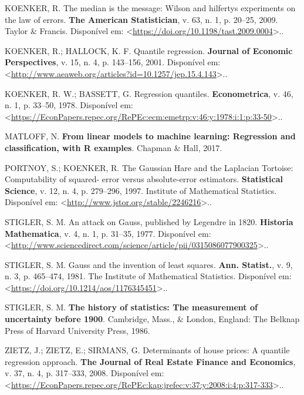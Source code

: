 \documentclass[a4paper, 12pt]{article}
\begin{document}
\leavevmode\hypertarget{ref-mim}{}%
KOENKER, R. The median is the message: Wilson and hilfertys experiments
on the law of errors. \textbf{The American Statistician}, v. 63, n. 1,
p. 20--25, 2009. Taylor \& Francis. Disponível em:
\textless{}\url{https://doi.org/10.1198/tast.2009.0004}\textgreater{}..

\leavevmode\hypertarget{ref-qr}{}%
KOENKER, R.; HALLOCK, K. F. Quantile regression. \textbf{Journal of
Economic Perspectives}, v. 15, n. 4, p. 143--156, 2001. Disponível em:
\textless{}\url{http://www.aeaweb.org/articles?id=10.1257/jep.15.4.143}\textgreater{}..

\leavevmode\hypertarget{ref-koenker1978}{}%
KOENKER, R. W.; BASSETT, G. Regression quantiles. \textbf{Econometrica},
v. 46, n. 1, p. 33--50, 1978. Disponível em:
\textless{}\url{https://EconPapers.repec.org/RePEc:ecm:emetrp:v:46:y:1978:i:1:p:33-50}\textgreater{}..

\leavevmode\hypertarget{ref-matloff2017}{}%
MATLOFF, N. \textbf{From linear models to machine learning: Regression
and classification, with R examples}. Chapman \& Hall, 2017.

\leavevmode\hypertarget{ref-tortoise}{}%
PORTNOY, S.; KOENKER, R. The Gaussian Hare and the Laplacian Tortoise:
Computability of squared- error versus absolute-error estimators.
\textbf{Statistical Science}, v. 12, n. 4, p. 279--296, 1997. Institute
of Mathematical Statistics. Disponível em:
\textless{}\url{http://www.jstor.org/stable/2246216}\textgreater{}..

\leavevmode\hypertarget{ref-STIGLER197731}{}%
STIGLER, S. M. An attack on Gauss, published by Legendre in 1820.
\textbf{Historia Mathematica}, v. 4, n. 1, p. 31--35, 1977. Disponível
em:
\textless{}\url{http://www.sciencedirect.com/science/article/pii/0315086077900325}\textgreater{}..

\leavevmode\hypertarget{ref-stigler1981}{}%
STIGLER, S. M. Gauss and the invention of least squares. \textbf{Ann.
Statist.}, v. 9, n. 3, p. 465--474, 1981. The Institute of Mathematical
Statistics. Disponível em:
\textless{}\url{https://doi.org/10.1214/aos/1176345451}\textgreater{}..

\leavevmode\hypertarget{ref-stigler1986}{}%
STIGLER, S. M. \textbf{The history of statistics: The measurement of
uncertainty before 1900}. Cambridge, Mass., \& London, England: The
Belknap Press of Harvard University Press, 1986.

\leavevmode\hypertarget{ref-Zietz}{}%
ZIETZ, J.; ZIETZ, E.; SIRMANS, G. Determinants of house prices: A
quantile regression approach. \textbf{The Journal of Real Estate Finance
and Economics}, v. 37, n. 4, p. 317--333, 2008. Disponível em:
\textless{}\url{https://EconPapers.repec.org/RePEc:kap:jrefec:v:37:y:2008:i:4:p:317-333}\textgreater{}..
\end{document}
